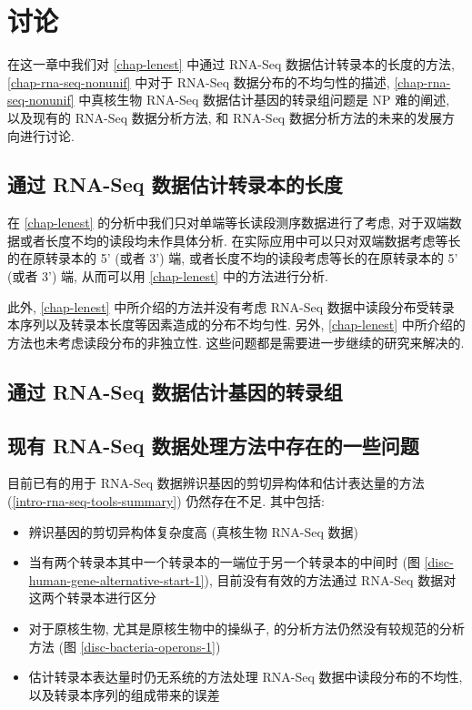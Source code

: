 \chapter{讨论}
在这一章中我们对 \ref{chap-lenest} 中通过 RNA-Seq 数据估计转录本的长度的方法, 
\ref{chap-rna-seq-nonunif} 中对于 RNA-Seq 数据分布的不均匀性的描述, 
\ref{chap-rna-seq-nonunif} 中真核生物 RNA-Seq 数据估计基因的转录组问题是 NP 难的阐述, 
以及现有的 RNA-Seq 数据分析方法, 
和 RNA-Seq 数据分析方法的未来的发展方向进行讨论. 

\section{通过 RNA-Seq 数据估计转录本的长度}
在 \ref{chap-lenest} 的分析中我们只对单端等长读段测序数据进行了考虑, 
对于双端数据或者长度不均的读段均未作具体分析. 
在实际应用中可以只对双端数据考虑等长的在原转录本的 5' (或者 3') 端, 
或者长度不均的读段考虑等长的在原转录本的 5' (或者 3') 端, 
从而可以用 \ref{chap-lenest} 中的方法进行分析. 

此外, \ref{chap-lenest} 中所介绍的方法并没有考虑 RNA-Seq 
数据中读段分布受转录本序列以及转录本长度等因素造成的分布不均匀性. 
另外, \ref{chap-lenest} 中所介绍的方法也未考虑读段分布的非独立性. 
这些问题都是需要进一步继续的研究来解决的. 

\section{通过 RNA-Seq 数据估计基因的转录组}

\section{现有 RNA-Seq 数据处理方法中存在的一些问题}
目前已有的用于 RNA-Seq 数据辨识基因的剪切异构体和估计表达量的方法 
(\ref{intro-rna-seq-tools-summary}) 仍然存在不足. 
其中包括: 
\begin{itemize}
\item 辨识基因的剪切异构体复杂度高 (真核生物 RNA-Seq 数据)

\item 当有两个转录本其中一个转录本的一端位于另一个转录本的中间时 
(图 \ref{disc-human-gene-alternative-start-1}), 
目前没有有效的方法通过 RNA-Seq 数据对这两个转录本进行区分

\item 对于原核生物, 尤其是原核生物中的操纵子, 的分析方法仍然没有较规范的分析方法 
\cite{mcclure2013computational} (图 \ref{disc-bacteria-operons-1})

\item 估计转录本表达量时仍无系统的方法处理 RNA-Seq 数据中读段分布的不均性, 
以及转录本序列的组成带来的误差 \cite{oshlack2009transcript, jones2012new} 
\end{itemize}

